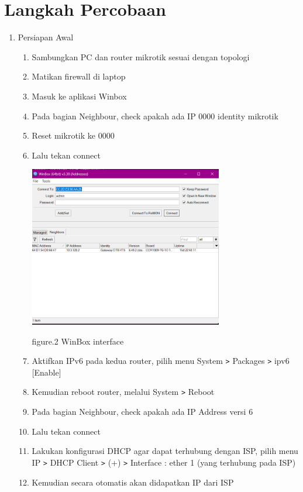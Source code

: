 \section{Langkah Percobaan}
\begin{enumerate}
    \item Persiapan Awal
    
    \begin{enumerate}
        \item Sambungkan PC dan router mikrotik sesuai dengan topologi
        \item Matikan firewall di laptop
        \item Masuk ke aplikasi Winbox
        \item Pada bagian Neighbour, check apakah ada IP 0000 identity mikrotik
        \item Reset mikrotik ke 0000
        \item Lalu tekan connect
    
        \begin{center}
            \includegraphics[width=0.7\textwidth]{image/Winbox-interface.png}    
        
            figure.2 WinBox interface
        \end{center}

        \item Aktifkan IPv6 pada kedua router, pilih menu System \texttt{\text>} Packages \texttt{\text>} ipv6 [Enable]
        \item Kemudian reboot router, melalui System \texttt{\text>} Reboot
        \item Pada bagian Neighbour, check apakah ada IP Address versi 6
        \item Lalu tekan connect
        \item Lakukan konfigurasi DHCP agar dapat terhubung dengan ISP, pilih menu IP \texttt{\text>} DHCP Client \texttt{\text>} (+) \texttt{\text>} Interface : ether 1 (yang terhubung pada ISP)
        \item Kemudian secara otomatis akan didapatkan IP dari ISP
    

\end{enumerate}
\end{enumerate}
